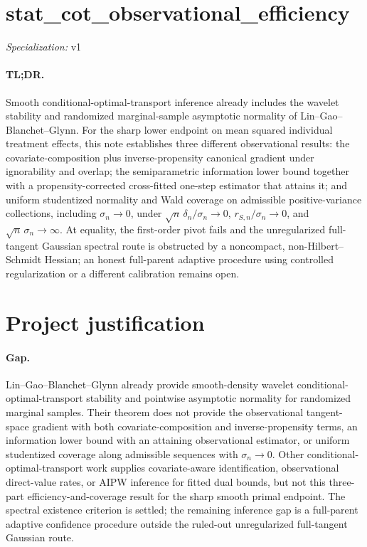 \documentclass{article}
\begin{document}
\sloppy

\section*{stat\_\allowbreak{}cot\_\allowbreak{}observational\_\allowbreak{}efficiency}

\noindent\textit{Specialization:} v1\par

\paragraph{TL;DR.} Smooth conditional-optimal-transport inference already includes the wavelet stability and randomized marginal-sample asymptotic normality of Lin--Gao--Blanchet--Glynn. For the sharp lower endpoint on mean squared individual treatment effects, this note establishes three different observational results: the covariate-composition plus inverse-propensity canonical gradient under ignorability and overlap; the semiparametric information lower bound together with a propensity-corrected cross-fitted one-step estimator that attains it; and uniform studentized normality and Wald coverage on admissible positive-variance collections, including \(\sigma_n\to0\), under \(\sqrt n\,\delta_n/\sigma_n\to0\), \(r_{S,n}/\sigma_n\to0\), and \(\sqrt n\,\sigma_n\to\infty\). At equality, the first-order pivot fails and the unregularized full-tangent Gaussian spectral route is obstructed by a noncompact, non-Hilbert--Schmidt Hessian; an honest full-parent adaptive procedure using controlled regularization or a different calibration remains open.

\section{Project justification}

\paragraph{Gap.} Lin--Gao--Blanchet--Glynn already provide smooth-density wavelet conditional-optimal-transport stability and pointwise asymptotic normality for randomized marginal samples. Their theorem does not provide the observational tangent-space gradient with both covariate-composition and inverse-propensity terms, an information lower bound with an attaining observational estimator, or uniform studentized coverage along admissible sequences with \(\sigma_n\to0\). Other conditional-optimal-transport work supplies covariate-aware identification, observational direct-value rates, or AIPW inference for fitted dual bounds, but not this three-part efficiency-and-coverage result for the sharp smooth primal endpoint. The spectral existence criterion is settled; the remaining inference gap is a full-parent adaptive confidence procedure outside the ruled-out unregularized full-tangent Gaussian route.
\end{document}
